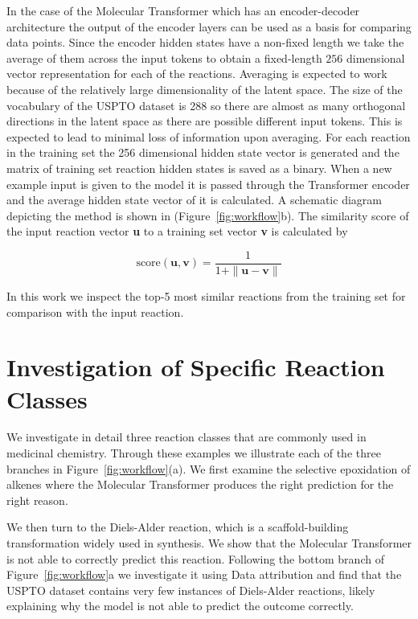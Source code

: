 In the case of the Molecular Transformer which has an encoder-decoder architecture the output of the encoder layers can be used as a basis for comparing data points. Since the encoder hidden states have a non-fixed length we take the average of them across the input tokens to obtain a fixed-length $256$ dimensional vector representation for each of the reactions. Averaging is expected to work because of the relatively large dimensionality of the latent space. The size of the vocabulary of the USPTO dataset is 288 so there are almost as many orthogonal directions in the latent space as there are possible different input tokens. This is expected to lead to minimal loss of information upon averaging. For each reaction in the training set the 256 dimensional hidden state vector is generated and the matrix of training set reaction hidden states is saved as a binary. When a new example input is given to the model it is passed through the Transformer encoder and the average hidden state vector of it is calculated. A schematic diagram depicting the method is shown in (Figure~\ref{fig:workflow}b). The similarity score of the input reaction vector \textbf{u} to a training set vector \textbf{v} is calculated by

\begin{equation}
    \textrm{score}(\textbf{u},\textbf{v}) = \frac{1}{1 + \|\textbf{u} - \textbf{v} \|}
\end{equation}

In this work we inspect the top-5 most similar reactions from the training set for comparison with the input reaction.

\section{Investigation of Specific Reaction Classes}

We investigate in detail three reaction classes that are commonly used in medicinal chemistry. Through these examples we illustrate each of the three branches in Figure~\ref{fig:workflow}(a). We first examine the selective epoxidation of alkenes where the Molecular Transformer produces the right prediction for the right reason.

We then turn to the Diels-Alder reaction, which is a scaffold-building transformation widely used in synthesis. We show that the Molecular Transformer is not able to correctly predict this reaction. Following the bottom branch of Figure~\ref{fig:workflow}a we investigate it using Data attribution and find that the USPTO dataset contains very few instances of Diels-Alder reactions, likely explaining why the model is not able to predict the outcome correctly.

